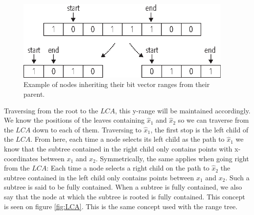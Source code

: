 \begin{figure}[h]
    \centering
    \includegraphics[width=0.95\textwidth]{pictures/bit_vector_split2.eps}
    \caption{Example of nodes inheriting their bit vector ranges from their parent.}
    \label{fig:bitvectorsplit}
\end{figure}

Traversing from the root to the $LCA$, this y-range will be maintained accordingly. We know the positions of the leaves containing $\hat{x}_1$ and $\hat{x}_2$ so we can traverse from the $LCA$ down to each of them. Traversing to $\hat{x}_1$, the first stop is the left child of the $LCA$. From here, each time a node selects its left child as the path to $\hat{x}_1$ we know that the subtree contained in the right child only contains points with x-coordinates between $x_1$ and $x_2$. Symmetrically, the same applies when going right from the $LCA$: Each time a node selects a right child on the path to $\hat{x}_2$ the subtree contained in the left child only contains points between $x_1$ and $x_2$. Such a subtree is said to be fully contained. When a subtree is fully contained, we also say that the node at which the subtree is rooted is fully contained. This concept is seen on figure \ref{fig:LCA}. This is the same concept used with the range tree. \\

